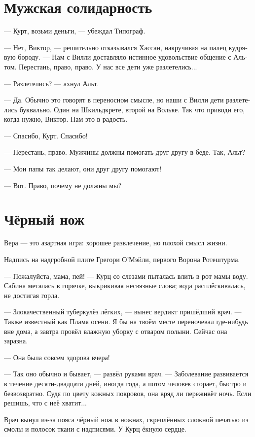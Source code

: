 \documentclass[a4paper,12pt,fleqn]{book}\usepackage{cooltooltips}\usepackage{polyglossia}\setdefaultlanguage[babelshorthands=true]{russian}\setotherlanguage{english}\defaultfontfeatures{Ligatures=TeX,Mapping=tex-text} \usepackage{xcolor}\definecolor{lightgray}{HTML}{bbbbbb}\color{lightgray}\newcommand{\ml}[3]{\textenglish{\textcolor{black}{#3}}}
\begin{document}
\section{Мужская солидарность}

--- Курт, возьми деньги, --- убеждал Типограф.

--- Нет, Виктор, --- решительно отказывался Хассан, накручивая на палец кудрявую бороду.
--- Нам с Вилли доставляло истинное удовольствие общение с Альтом.
Перестань, право, право.
У нас все дети уже разлетелись...

--- Разлетелись? --- ахнул Альт.

--- Да.
Обычно это говорят в переносном смысле, но наши с Вилли дети разлетелись буквально.
Один на Шкильдкрете, второй на Вольке.
Так что приводи его, когда нужно, Виктор.
Нам это в радость.

--- Спасибо, Курт.
Спасибо!

--- Перестань, право.
Мужчины должны помогать друг другу в беде.
Так, Альт?

--- Мои папы так делают, они друг другу помогают!

--- Вот.
Право, почему не должны мы?

\section{Чёрный нож}

\epigraph
{Вера --- это азартная игра: хорошее развлечение, но плохой смысл жизни.}
{Надпись на надгробной плите Грегори О'Мэйли, первого Ворона Ротештурма.}

--- Пожалуйста, мама, пей! --- Курц со слезами пыталась влить в рот мамы воду.
Сабина металась в горячке, выкрикивая несвязные слова;
вода расплёскивалась, не достигая горла.

--- Злокачественный туберкулёз лёгких, --- вынес вердикт пришёдший врач.
--- Также известный как Пламя осени.
Я бы на твоём месте переночевал где-нибудь вне дома, а завтра провёл влажную уборку с отваром полыни.
Сейчас она заразна.

--- Она была совсем здорова вчера!

--- Так оно обычно и бывает, --- развёл руками врач.
--- Заболевание развивается в течение десяти-двадцати дней, иногда года, а потом человек сгорает, быстро и безвозвратно.
Судя по цвету кожных покровов, она вряд ли переживёт ночь.
Если решишь, что с неё хватит...

Врач вынул из-за пояса чёрный нож в ножнах, скреплённых сложной печатью из смолы и полосок ткани с надписями.
У Курц ёкнуло сердце.
\end{document}
